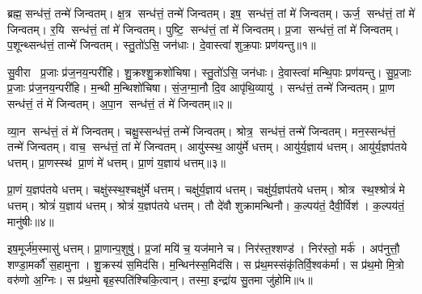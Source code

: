 



\setcounter{anuvakam}{0}
ब्रह्म॒ सन्ध॑त्तं॒ तन्मे॑ जिन्वतम्। क्ष॒त्र सन्ध॑त्तं॒ तन्मे॑ जिन्वतम्। इष॒ सन्ध॑त्तं॒ तां मे॑ जिन्वतम्। ऊर्ज॒ सन्ध॑त्तं॒ तां मे॑ जिन्वतम्। र॒यि सन्ध॑त्तं॒ तां मे॑ जिन्वतम्। पुष्टि॒ सन्ध॑त्तं॒ तां मे॑ जिन्वतम्। प्र॒जा सन्ध॑त्तं॒ तां मे॑ जिन्वतम्। प॒शून्थ्सन्ध॑त्तं॒ तान्मे॑ जिन्वतम्। स्तु॒तो॑ऽसि॒ जन॑धाः। दे॒वास्त्वा॑ शुक्र॒पाः प्रण॑यन्तु॥१॥

सु॒वीरा प्र॒जाः प्र॑ज॒नय॒न्परी॑हि। शु॒क्रश्शु॒क्रशो॑चिषा। स्तु॒तो॑ऽसि॒ जन॑धाः। दे॒वास्त्वा॑ मन्थि॒पाः प्रण॑यन्तु। सु॒प्र॒जाः प्र॒जाः प्र॑ज॒नय॒न्परी॑हि। म॒न्थी म॒न्थिशो॑चिषा। सं॒ज॒ग्मा॒नौ दि॒व आपृ॑थि॒व्यायु॑। सन्ध॑त्तं॒ तन्मे॑ जिन्वतम्। प्रा॒ण सन्ध॑त्तं॒ तं मे॑ जिन्वतम्। अ॒पा॒न सन्ध॑त्तं॒ तं मे॑ जिन्वतम्॥२॥

व्या॒न सन्ध॑त्तं॒ तं मे॑ जिन्वतम्। चक्षु॒स्सन्ध॑त्तं॒ तन्मे॑ जिन्वतम्। श्रोत्र॒ सन्ध॑त्तं॒ तन्मे॑ जिन्वतम्। मन॒स्सन्ध॑त्तं॒ तन्मे॑ जिन्वतम्। वाच॒ सन्ध॑त्तं॒ तां मे॑ जिन्वतम्। आयु॑स्स्थ॒ आयु॑र्मे धत्तम्। आयु॑र्य॒ज्ञाय॑ धत्तम्। आयु॑र्य॒ज्ञप॑तये धत्तम्। प्रा॒णस्स्थ॑ प्रा॒णं मे॑ धत्तम्। प्रा॒णं य॒ज्ञाय॑ धत्तम्॥३॥

प्रा॒णं य॒ज्ञप॑तये धत्तम्। चक्षु॑स्स्थ॒श्चक्षु॑र्मे धत्तम्। चक्षु॑र्य॒ज्ञाय॑ धत्तम्। चक्षु॑र्य॒ज्ञप॑तये धत्तम्। श्रोत्र स्थ॒श्श्रोत्रं॑ मे धत्तम्। श्रोत्रं॑ य॒ज्ञाय॑ धत्तम्। श्रोत्रं॑ य॒ज्ञप॑तये धत्तम्। तौ दे॑वौ शुक्रामन्थिनौ। क॒ल्पय॑तं॒ दैवी॒र्विश॑। क॒ल्पय॑तं॒ मानु॑षीः॥४॥

इष॒मूर्ज॑म॒स्मासु॑ धत्तम्। प्रा॒णान्प॒शुषु॑। प्र॒जां मयि॑ च॒ यज॑माने च। निर॑स्त॒श्शण्ड॑। निर॑स्तो॒ मर्क॑। अप॑नुत्तौ॒ शण्डा॒मर्कौ॑ स॒हामुना। शु॒क्रस्य॑ स॒मिद॑सि। म॒न्थिन॑स्स॒मिद॑सि। स प्र॑थ॒मस्संकृ॑तिर्वि॒श्वक॑र्मा। स प्र॑थ॒मो मि॒त्रो वरु॑णो अ॒ग्निः। स प्र॑थ॒मो बृह॒स्पति॑श्चिकि॒त्वान्। तस्मा॒ इन्द्रा॑य सु॒तमा जु॑होमि॥५॥\anuvakamend[न॒य॒न्त्व॒पा॒न सन्ध॑त्तं॒ तं मे॑ जिन्वतं प्रा॒णं य॒ज्ञाय॑ धत्तं॒ मानु॑षीर॒ग्निर्द्वे च॑॥ (ब्रह्म॑ क्ष॒त्रं तदिष॒मूर्ज र॒यिं पुष्टिं॑ प्र॒जां तां प॒शून्तान्थ्सन्ध॑त्तं॒ तत्प्रा॒णम॑पा॒नं व्या॒नं तं चक्षु॒श्श्रोत्रं॒ मन॒स्तद्वाचं॒ ताम्। इ॒षादि॒पञ्च॑के॒ वाचं॒ तां मे॑ प॒शून्थ्सन्ध॑त्तं॒ तान्मे प्रा॒णादि॒त्रित॑ये॒ तं मे॒ऽन्यत्र॒ तन्मे)]

